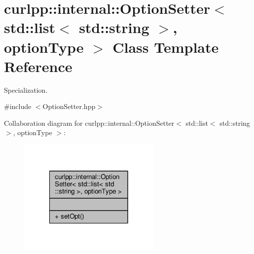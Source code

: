 \hypertarget{classcurlpp_1_1internal_1_1OptionSetter_3_01std_1_1list_3_01std_1_1string_01_4_00_01optionType_01_4}{\section{curlpp\-:\-:internal\-:\-:Option\-Setter$<$ std\-:\-:list$<$ std\-:\-:string $>$, option\-Type $>$ Class Template Reference}
\label{classcurlpp_1_1internal_1_1OptionSetter_3_01std_1_1list_3_01std_1_1string_01_4_00_01optionType_01_4}
}


Specialization.  




{\ttfamily \#include $<$Option\-Setter.\-hpp$>$}



Collaboration diagram for curlpp\-:\-:internal\-:\-:Option\-Setter$<$ std\-:\-:list$<$ std\-:\-:string $>$, option\-Type $>$\-:
\nopagebreak
\begin{figure}[H]
\begin{center}
\leavevmode
\includegraphics[width=198pt]{classcurlpp_1_1internal_1_1OptionSetter_3_01std_1_1list_3_01std_1_1string_01_4_00_01optionType_01_4__coll__graph}
\end{center}
\end{figure}
